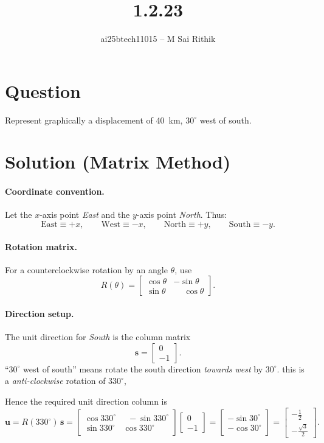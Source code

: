 \documentclass[12pt]{article}
\title{1.2.23}
\author{ai25btech11015 -- M Sai Rithik}
\date{}
\begin{document}
\maketitle

\section*{Question}
Represent graphically a displacement of \SI{40}{km}, $30^\circ$ west of south.

\section*{Solution (Matrix Method)}
\paragraph{Coordinate convention.}
Let the $x$-axis point \emph{East} and the $y$-axis point \emph{North}. Thus:
\[
\text{East} \equiv +x,\qquad
\text{West} \equiv -x,\qquad
\text{North} \equiv +y,\qquad
\text{South} \equiv -y.
\]

\paragraph{Rotation matrix.}
For a counterclockwise rotation by an angle $\theta$, use
\[
R(\theta)=
\begin{bmatrix}
\cos\theta & -\sin\theta\\
\sin\theta & \phantom{-}\cos\theta
\end{bmatrix}.
\]

\paragraph{Direction setup.}
The unit direction for \emph{South} is the column matrix
\[
\mathbf{s}=
\begin{bmatrix}
0\\
-1
\end{bmatrix}.
\]
``$30^\circ$ west of south'' means rotate the south direction \emph{towards west} by $30^\circ$.
this is a
\emph{anti-clockwise} rotation of $330^\circ$, 

Hence the required unit direction column is
\[
\mathbf{u}
=
R(330^\circ)\,\mathbf{s}
=
\begin{bmatrix}
\cos 330^\circ & \;\;-\sin 330^\circ\\[2pt]
\sin 330^\circ & \cos 330^\circ
\end{bmatrix}
\begin{bmatrix}
0\\
-1
\end{bmatrix}
=
\begin{bmatrix}
-\sin 30^\circ\\[2pt]
-\cos 30^\circ
\end{bmatrix}
=
\begin{bmatrix}
-\tfrac{1}{2}\\[2pt]
-\tfrac{\sqrt{3}}{2}
\end{bmatrix}.
\]
\end{document}
